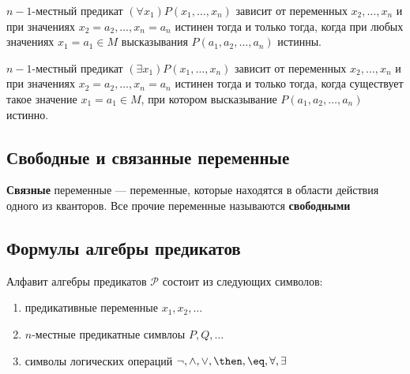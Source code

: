 $n-1$-местный предикат $(\forall x_1)P(x_1,\dots,x_n)$ зависит от переменных $x_2,\dots,x_n$ и при значениях $x_2=a_2,\dots,x_n=a_n$ истинен тогда и только тогда, когда при любых значениях $x_1 = a_1 \in M$ высказывания $P(a_1,a_2,\dots,a_n)$ истинны.

$n-1$-местный предикат $(\exists x_1)P(x_1,\dots,x_n)$ зависит от переменных $x_2,\dots,x_n$ и при значениях $x_2=a_2,\dots,x_n=a_n$ истинен тогда и только тогда, когда существует такое значение $x_1 = a_1 \in M$, при котором высказывание $P(a_1,a_2,\dots,a_n)$ истинно.

\subsection{Свободные и связанные переменные}
\dftion \textbf{Связные} переменные --- переменные, которые находятся в области действия одного из кванторов. Все прочие переменные называются \textbf{свободными}

\subsection{Формулы алгебры предикатов}
\dftion Алфавит алгебры предикатов $\mathscr{P}$ состоит из следующих символов:
\begin{enumerate}
    \item предикативные переменные $x_1, x_2, \dots$
    \item $n$-местные предикатные симвлоы $P, Q, \dots$
    \item символы логических операций $\lnot, \land, \lor, \then, \eq, \forall, \exists$
\end{enumerate}